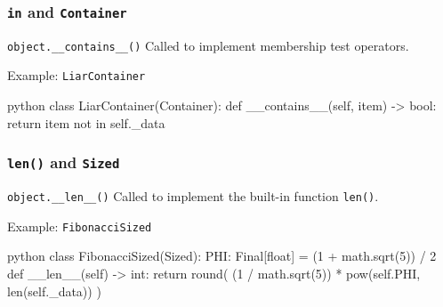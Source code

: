 \documentclass[aspectratio=169,dvipdfmx,12pt,notheorems]{beamer}
\theoremstyle{definition}
\begin{document}
%

\begin{frame}[fragile]\frametitle{\texttt{in} and \texttt{Container}}

\begin{block}{\texttt{object.\_\_contains\_\_()}}
Called to implement membership test operators.
\end{block}

\begin{exampleblock}{Example: \texttt{LiarContainer}}
\begin{pygments}{python}
class LiarContainer(Container):
    def __contains__(self, item) -> bool:
        return item not in self._data
\end{pygments}
\end{exampleblock}

\end{frame}

\begin{frame}[fragile]\frametitle{\texttt{len()} and \texttt{Sized}}

\begin{block}{\texttt{object.\_\_len\_\_()}}
Called to implement the built-in function \texttt{len()}.
\end{block}

\begin{exampleblock}{Example: \texttt{FibonacciSized}}
\begin{pygments}{python}
class FibonacciSized(Sized):
    PHI: Final[float] = (1 + math.sqrt(5)) / 2
    def __len__(self) -> int:
        return round(
            (1 / math.sqrt(5))
            * pow(self.PHI, len(self._data))
        )
\end{pygments}
\end{exampleblock}

\end{frame}
\end{document}
